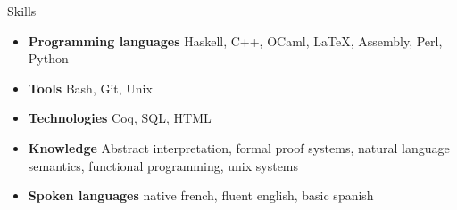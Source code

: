 \documentclass[a4paper,14pt]{extarticle}
\newcommand{\cvtitle}[1]{
    \begin{tcolorbox}[colback=bgcol,colframe=ForestGreen,
        height=1cm, valign=center, sharp corners=downhill]
        {\Large #1}
    \end{tcolorbox}
}
\begin{document}
\begin{minipage}[c][282mm][t]{0.60\linewidth}
        \cvtitle{Skills}

        \begin{itemize}
            \item \textbf{Programming languages} Haskell, C++, OCaml, \LaTeX, Assembly, Perl, Python
            \item \textbf{Tools} Bash, Git, Unix
            \item \textbf{Technologies} Coq, SQL, HTML
            \item \textbf{Knowledge} Abstract interpretation, formal proof systems, natural language semantics,
                functional programming, unix systems
            \item \textbf{Spoken languages} native french, fluent english, basic spanish
        \end{itemize}

    \end{minipage}
\end{document}
